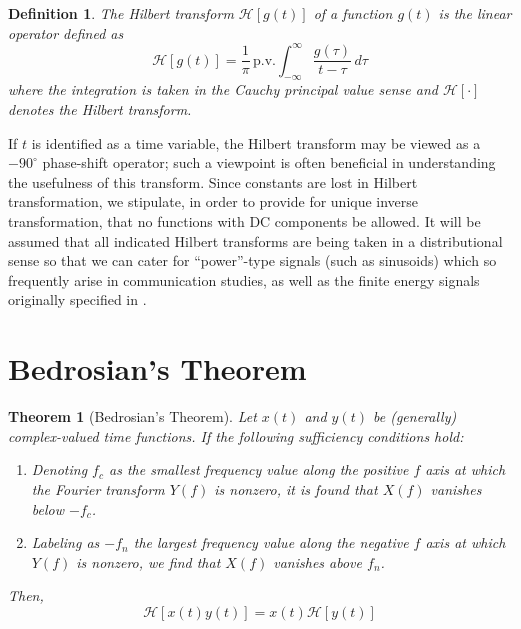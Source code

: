 \documentclass[12pt]{article}
\newtheorem{theorem}{Theorem}[section]
\newtheorem{definition}{Definition}[section]
\begin{document}
\begin{definition}\label{def:hilbert}
The Hilbert transform $\mathcal{H}[g(t)]$ of a function $g(t)$ is the linear operator defined as
\begin{equation}
\mathcal{H}[g(t)] = \frac{1}{\pi} \, \mathrm{p.v.} \int_{-\infty}^{\infty} \frac{g(\tau)}{t - \tau} \, d\tau
\label{eq:hilbert_def}
\end{equation}
where the integration is taken in the Cauchy principal value sense and $\mathcal{H}[\cdot]$ denotes the Hilbert transform.
\end{definition}

If $t$ is identified as a time variable, the Hilbert transform may be viewed as a $-90^\circ$ phase-shift operator; such a viewpoint is often beneficial in understanding the usefulness of this transform. Since constants are lost in Hilbert transformation, we stipulate, in order to provide for unique inverse transformation, that no functions with DC components be allowed. It will be assumed that all indicated Hilbert transforms are being taken in a distributional sense so that we can cater for “power”-type signals (such as sinusoids) which so frequently arise in communication studies, as well as the finite energy signals originally specified in \cite{Bedrosian1963}.

\section{Bedrosian's Theorem}

\begin{theorem}[Bedrosian's Theorem]\label{thm:bedrosian}
Let $x(t)$ and $y(t)$ be (generally) complex-valued time functions. If the following sufficiency conditions hold:
\begin{enumerate}[label=(\alph*)]
    \item Denoting $f_c$ as the smallest frequency value along the positive $f$ axis at which the Fourier transform $Y(f)$ is nonzero, it is found that $X(f)$ vanishes below $-f_c$.
    \item Labeling as $-f_n$ the largest frequency value along the negative $f$ axis at which $Y(f)$ is nonzero, we find that $X(f)$ vanishes above $f_n$.
\end{enumerate}
Then,
\begin{equation}
\mathcal{H}[x(t) y(t)] = x(t) \mathcal{H}[y(t)]
\label{eq:bedrosian}
\end{equation}
\end{theorem}
\end{document}
